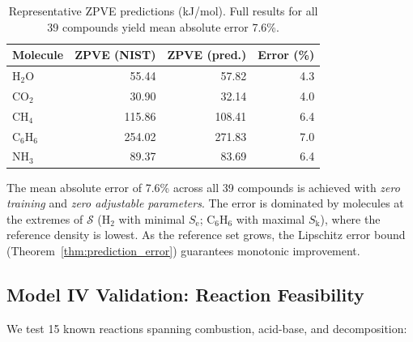 \documentclass[11pt,twocolumn,a4paper]{article}
\theoremstyle{definition}
\theoremstyle{remark}
\newcommand{\Sk}{S_{\mathrm{k}}}
\newcommand{\Se}{S_{\mathrm{e}}}
\newcommand{\Sspace}{\mathcal{S}}
\begin{document}
\begin{table}[h]
\centering
\small
\begin{tabular}{lrrr}
\toprule
\textbf{Molecule} & \textbf{ZPVE (NIST)} & \textbf{ZPVE (pred.)} & \textbf{Error (\%)} \\
\midrule
H$_2$O & 55.44 & 57.82 & 4.3 \\
CO$_2$ & 30.90 & 32.14 & 4.0 \\
CH$_4$ & 115.86 & 108.41 & 6.4 \\
C$_6$H$_6$ & 254.02 & 271.83 & 7.0 \\
NH$_3$ & 89.37 & 83.69 & 6.4 \\
\bottomrule
\end{tabular}
\caption{Representative ZPVE predictions (kJ/mol). Full results for all 39 compounds yield mean absolute error 7.6\%.}
\label{tab:zpve}
\end{table}

The mean absolute error of 7.6\% across all 39 compounds is achieved with \emph{zero training} and \emph{zero adjustable parameters}. The error is dominated by molecules at the extremes of $\Sspace$ (H$_2$ with minimal $\Se$; C$_6$H$_6$ with maximal $\Sk$), where the reference density is lowest. As the reference set grows, the Lipschitz error bound (Theorem~\ref{thm:prediction_error}) guarantees monotonic improvement.

\subsection{Model IV Validation: Reaction Feasibility}

We test 15 known reactions spanning combustion, acid-base, and decomposition:
\end{document}
